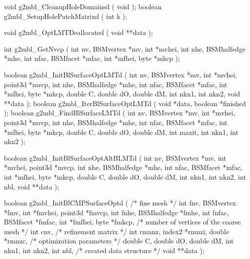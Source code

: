 \begin{listingC}
void g2mbl_CleanupHoleDomainsd ( void );
boolean g2mbl_SetupHolePatchMatrixd ( int k );
\end{listingC}

\begin{listingC}
void g2mbl_OptLMTDeallocated ( void **data );
\end{listingC}

\begin{listingC}
int g2mbl_GetNvcp ( int nv, BSMvertex *mv, int *mvhei,
                    int nhe, BSMhalfedge *mhe,
                    int nfac, BSMfacet *mfac, int *mfhei,
                    byte *mkcp );
\end{listingC}

\begin{listingC}
boolean g2mbl_InitBlSurfaceOptLMTd ( int nv, BSMvertex *mv, int *mvhei,
                                     point3d *mvcp, int nhe, BSMhalfedge
*mhe,
                                     int nfac, BSMfacet *mfac, int *mfhei,
                                     byte *mkcp,
                                     double C, double dO, double dM,
                                     int nkn1, int nkn2, void **data );
boolean g2mbl_IterBlSurfaceOptLMTd ( void *data, boolean *finished );  
boolean g2mbl_FindBlSurfaceLMTd ( int nv, BSMvertex *mv, int *mvhei,   
                                  point3d *mvcp, int nhe, BSMhalfedge *mhe,
                                  int nfac, BSMfacet *mfac, int *mfhei,
                                  byte *mkcp,
                                  double C, double dO, double dM,
                                  int maxit, int nkn1, int nkn2 );
\end{listingC}

\begin{listingC}
boolean g2mbl_InitBlSurfaceOptAltBLMTd ( int nv, BSMvertex *mv, int *mvhei,
                                         point3d *mvcp, int nhe, BSMhalfedge *mhe,
                                         int nfac, BSMfacet *mfac, int *mfhei,
                                         byte *mkcp,
                                         double C, double dO, double dM,
                                         int nkn1, int nkn2, int nbl,   
                                         void **data );
\end{listingC}

\begin{listingC}
boolean g2mbl_InitBlCMPSurfaceOptd ( /* fine mesh */
                    int fnv, BSMvertex *fmv, int *fmvhei, point3d *fmvcp,
                    int fnhe, BSMhalfedge *fmhe,
                    int fnfac, BSMfacet *fmfac, int *fmfhei,
                    byte *fmkcp,
                           /* number of vertices of the coarse mesh */
                    int cnv,
                           /* refinement matrix */
                    int rmnnz, index2 *rmnzi, double *rmnzc,
                           /* optimization parameters */
                    double C, double dO, double dM,
                    int nkn1, int nkn2, int nbl,   
                           /* created data structure */
                    void **data );
\end{listingC}

